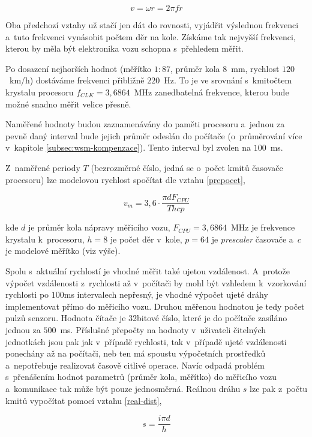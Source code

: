 $$v = \omega r = 2 \pi f r$$

Oba předchozí vztahy už stačí jen dát do rovnosti, vyjádřit výslednou frekvenci
a~tuto frekvenci vynásobit počtem děr na kole. Získáme tak nejvyšší frekvenci,
kterou by měla být elektronika vozu schopna s~přehledem měřit.

Po dosazení nejhorších hodnot (měřítko $1:87$, průměr kola $8$~mm, rychlost
$120$~km/h) dostáváme frekvenci přibližně $220$~Hz. To je ve srovnání
s~kmitočtem krystalu procesoru $f_{CLK} = 3,6864$~MHz zanedbatelná frekvence,
kterou bude možné snadno měřit velice přesně.

Naměřené hodnoty budou zaznamenávány do paměti procesoru a~jednou za pevně daný
interval bude jejich průměr odeslán do počítače (o~průměrování více v~kapitole
\ref{subsec:wsm-kompenzace}). Tento interval byl zvolen na $100$~ms.

Z~naměřené periody $T$ (bezrozměrné číslo, jedná se o~počet kmitů časovače
procesoru) lze modelovou rychlost spočítat dle vztahu \ref{prepocet},

\begin{equation}
v_m = 3,6 \cdot \frac{\pi d F_{CPU}}{T h c p}
\label{prepocet}
\end{equation}

kde $d$ je průměr kola nápravy měřicího vozu, $F_{CPU} = 3,6864$~MHz je
frekvence krystalu k~procesoru, $h = 8$ je počet děr v~kole, $p = 64$ je
\textit{prescaler} časovače a~$c$ je modelové měřítko (viz výše).

Spolu s~aktuální rychlostí je vhodné měřit také ujetou vzdálenost. A~protože
výpočet vzdálenosti z~rychlosti až v~počítači by mohl být vzhledem k~vzorkování
rychlosti po $100$ms intervalech nepřesný, je vhodné výpočet ujeté dráhy
implementovat přímo do měřicího vozu. Druhou měřenou hodnotou je tedy počet
pulzů senzoru. Hodnota čítače je 32bitové číslo, které je do počítače zasíláno
jednou za $500$~ms. Příslušné přepočty na hodnoty v~uživateli čitelných
jednotkách jsou pak jak v~případě rychlosti, tak v~případě ujeté vzdálenosti
ponechány až na počítači, neb ten má spoustu výpočetních prostředků
a~nepotřebuje realizovat časově citlivé operace. Navíc odpadá problém
s~přenášením hodnot parametrů (průměr kola, měřítko) do měřicího vozu
a~komunikace tak může být pouze jednosměrná. Reálnou dráhu $s$ lze pak z~počtu
kmitů vypočítat pomocí vztahu \ref{real-dist},

\begin{equation}
s = \frac{i \pi d}{h}
\label{real-dist}
\end{equation}

